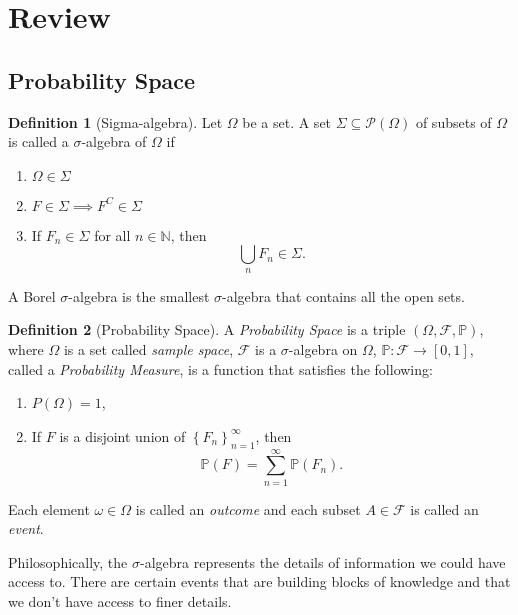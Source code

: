 \documentclass[
  openany]{book}
\theoremstyle{definition}
\newtheorem{definition}{Definition}[chapter]
\theoremstyle{definition}
\theoremstyle{definition}
\theoremstyle{definition}
\theoremstyle{remark}
\begin{document}
\section{Review}\label{review}

\subsection{Probability Space}\label{probability-space}

\begin{definition}[Sigma-algebra]

Let \(\Omega\) be a set.
A set \(\Sigma \subseteq \mathcal{P}(\Omega)\) of subsets of \(\Omega\) is called a \(\sigma\)-algebra
of \(\Omega\) if

\begin{enumerate}
\def\labelenumi{\arabic{enumi}.}
\item
  \(\Omega\in \Sigma\)
\item
  \(F \in \Sigma \implies F^C \in \Sigma\)
\item
  If \(F_n \in \Sigma\) for all \(n\in \mathbb{N}\), then
  \[ \bigcup_n F_n \in \Sigma .\]
\end{enumerate}

\end{definition}

A Borel \(\sigma\)-algebra is the smallest \(\sigma\)-algebra that contains all the open sets.

\begin{definition}[Probability Space]
A \emph{Probability Space} is a triple \((\Omega, \mathcal{F}, \mathbb{P})\), where
\(\Omega\) is a set called \emph{sample space}, \(\mathcal{F}\) is a \(\sigma\)-algebra on \(\Omega\),
\(\mathbb{P}: \mathcal{F}\to [0,1]\), called a \emph{Probability Measure}, is a function that satisfies the following:

\begin{enumerate}
\def\labelenumi{\arabic{enumi}.}
\item
  \(P(\Omega) =1\),
\item
  If \(F\) is a disjoint union of \(\left\{ F_n \right\}_{n=1}^\infty\), then
  \[ \mathbb{P}(F) = \sum_{n=1}^\infty \mathbb{P}(F_n) . \]
\end{enumerate}

Each element \(\omega \in \Omega\) is called an \emph{outcome} and each subset \(A \in \mathcal{F}\)
is called an \emph{event}.
\end{definition}

Philosophically, the \(\sigma\)-algebra represents the details of information we could have access to.
There are certain events that are building blocks of knowledge and that we don't have
access to finer details.
\end{document}
